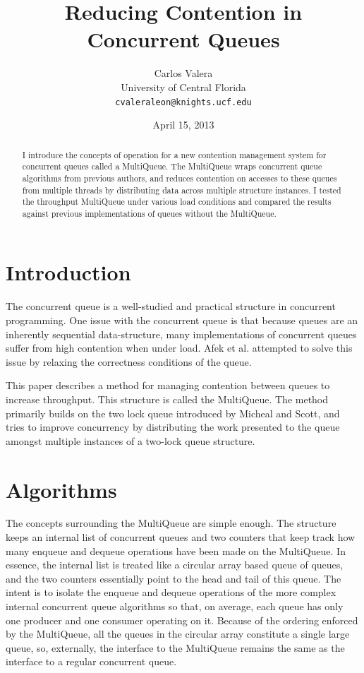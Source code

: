 \documentclass[12pt]{report}
\begin{document}
\title{Reducing Contention in Concurrent Queues}
\author{Carlos Valera \\
    University of Central Florida \\
    \texttt{cvaleraleon@knights.ucf.edu}}
\date{April 15, 2013}
\maketitle
\begin{abstract}
I introduce the concepts of operation for a new contention management system
for concurrent queues called a MultiQueue. The MultiQueue wraps concurrent
queue algorithms from previous authors, and reduces contention on accesses to
these queues from multiple threads by distributing data across multiple
structure instances. I tested the throughput MultiQueue under various
load conditions and compared the results against previous implementations of
queues without the MultiQueue.
\end{abstract}
\section{Introduction}
The concurrent queue is a well-studied and practical structure in concurrent
programming. One issue with the concurrent queue is that because queues are an
inherently sequential data-structure, many implementations of concurrent queues
suffer from high contention when under load. Afek et al. attempted to solve
this issue by relaxing the correctness conditions of the
queue\cite{afek2010quasi}.

This paper describes a method for managing contention between queues to
increase throughput. This structure is called the MultiQueue. The method
primarily builds on the two lock queue introduced by Micheal and
Scott\cite{michael1996}, and tries to improve concurrency by distributing the
work presented to the queue amongst multiple instances of a two-lock queue
structure. 

\section{Algorithms}
The concepts surrounding the MultiQueue are simple enough. The structure keeps
an internal list of concurrent queues and two counters that keep track how many
enqueue and dequeue operations have been made on the MultiQueue. In essence,
the internal list is treated like a circular array based queue of queues, and
the two counters essentially point to the head and tail of this queue. The
intent is to isolate the enqueue and dequeue operations of the more complex
internal concurrent queue algorithms so that, on average, each queue has only
one producer and one consumer operating on it. Because of the ordering enforced
by the MultiQueue, all the queues in the circular array constitute a single
large queue, so, externally, the interface to the MultiQueue remains the same
as the interface to a regular concurrent queue.
\end{document}
